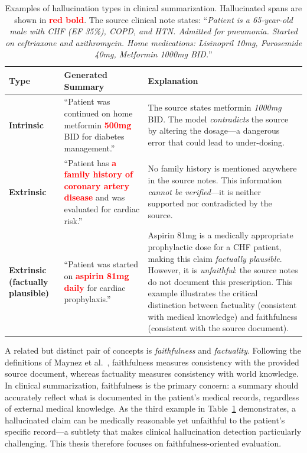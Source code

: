 \documentclass[12pt,a4paper,oneside]{report}
\begin{document}
\begin{table}[htbp]
\centering
\caption{Examples of hallucination types in clinical summarization. Hallucinated spans are shown in \textcolor{red}{\textbf{red bold}}. The source clinical note states: ``\textit{Patient is a 65-year-old male with CHF (EF 35\%), COPD, and HTN. Admitted for pneumonia. Started on ceftriaxone and azithromycin. Home medications: Lisinopril 10mg, Furosemide 40mg, Metformin 1000mg BID.}''}
\label{tab:hallucination-examples}
\small
\begin{tabular}{p{2.0cm}p{5.2cm}p{5.2cm}}
\toprule
\textbf{Type} & \textbf{Generated Summary} & \textbf{Explanation} \\
\midrule
\textbf{Intrinsic} &
``Patient was continued on home metformin \textcolor{red}{\textbf{500mg}} BID for diabetes management.'' &
The source states metformin \textit{1000mg} BID. The model \textit{contradicts} the source by altering the dosage---a dangerous error that could lead to under-dosing. \\
\midrule
\textbf{Extrinsic} &
``Patient has \textcolor{red}{\textbf{a family history of coronary artery disease}} and was evaluated for cardiac risk.'' &
No family history is mentioned anywhere in the source notes. This information \textit{cannot be verified}---it is neither supported nor contradicted by the source. \\
\midrule
\textbf{Extrinsic (factually plausible)} &
``Patient was started on \textcolor{red}{\textbf{aspirin 81mg daily}} for cardiac prophylaxis.'' &
Aspirin 81mg is a medically appropriate prophylactic dose for a CHF patient, making this claim \textit{factually plausible}. However, it is \textit{unfaithful}: the source notes do not document this prescription. This example illustrates the critical distinction between factuality (consistent with medical knowledge) and faithfulness (consistent with the source document). \\
\bottomrule
\end{tabular}
\end{table}

A related but distinct pair of concepts is \textit{faithfulness} and \textit{factuality}. Following the definitions of Maynez et al.~\cite{maynez2020faithfulness}, faithfulness measures consistency with the provided source document, whereas factuality measures consistency with world knowledge. In clinical summarization, faithfulness is the primary concern: a summary should accurately reflect what is documented in the patient's medical records, regardless of external medical knowledge. As the third example in Table~\ref{tab:hallucination-examples} demonstrates, a hallucinated claim can be medically reasonable yet unfaithful to the patient's specific record---a subtlety that makes clinical hallucination detection particularly challenging. This thesis therefore focuses on faithfulness-oriented evaluation.
\end{document}
